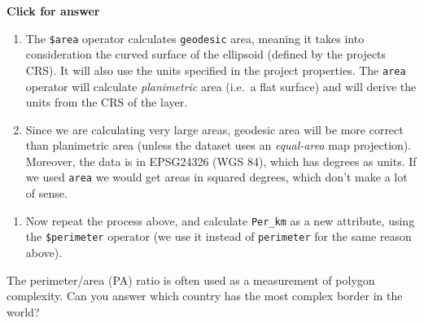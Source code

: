 \documentclass[
  letterpaper,
  DIV=11,
  numbers=noendperiod]{scrreprt}
\providecommand{\tightlist}{%
  \setlength{\itemsep}{0pt}\setlength{\parskip}{0pt}}\usepackage{longtable,booktabs,array}
\begin{document}
\begin{tcolorbox}[enhanced jigsaw, toprule=.15mm, breakable, left=2mm, colframe=quarto-callout-important-color-frame, colback=white, arc=.35mm, leftrule=.75mm, opacityback=0, rightrule=.15mm, bottomrule=.15mm]

\vspace{-3mm}\textbf{Click for answer}\vspace{3mm}

\begin{enumerate}
\def\labelenumi{\alph{enumi})}
\item
  The \texttt{\$area} operator calculates \texttt{geodesic} area,
  meaning it takes into consideration the curved surface of the
  ellipsoid (defined by the projects CRS). It will also use the units
  specified in the project properties. The \texttt{area} operator will
  calculate \emph{planimetric} area (i.e.~a flat surface) and will
  derive the units from the CRS of the layer.
\item
  Since we are calculating very large areas, geodesic area will be more
  correct than planimetric area (unless the dataset uses an
  \emph{equal-area} map projection). Moreover, the data is in EPSG24326
  (WGS 84), which has degrees as units. If we used \texttt{area} we
  would get areas in squared degrees, which don't make a lot of sense.
\end{enumerate}

\end{tcolorbox}

\begin{enumerate}
\def\labelenumi{(\arabic{enumi})}
\setcounter{enumi}{115}
\tightlist
\item
  Now repeat the process above, and calculate \texttt{Per\_km} as a new
  attribute, using the \texttt{\$perimeter} operator (we use it instead
  of \texttt{perimeter} for the same reason above).
\end{enumerate}

\begin{tcolorbox}[enhanced jigsaw, coltitle=black, toprule=.15mm, breakable, opacitybacktitle=0.6, left=2mm, colback=white, leftrule=.75mm, rightrule=.15mm, colbacktitle=quarto-callout-important-color!10!white, toptitle=1mm, titlerule=0mm, colframe=quarto-callout-important-color-frame, arc=.35mm, bottomtitle=1mm, opacityback=0, bottomrule=.15mm, title=\textcolor{quarto-callout-important-color}{\faExclamation}\hspace{0.5em}{Stop and Think}]

The perimeter/area (PA) ratio is often used as a measurement of polygon
complexity. Can you answer which country has the most complex border in
the world?

\end{tcolorbox}
\end{document}
